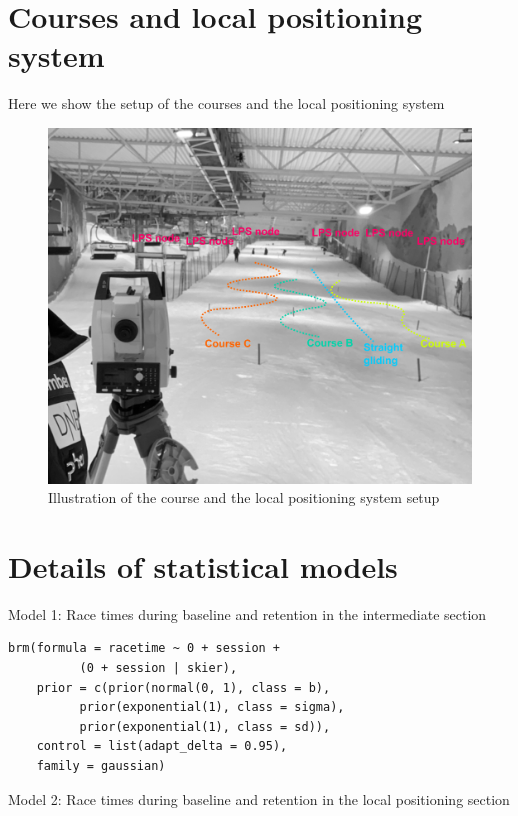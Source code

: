 \documentclass{article}
\begin{document}
\section{Courses and local positioning system} \label{appendixb}
Here we show the setup of the courses and the local positioning system


\begin{figure}[H]
\centering
\includegraphics{figurer/figure_appendix_LPS.jpg}
\caption{Illustration of the course and the local positioning system setup}\label{fig: coursesetting}
\end{figure}




\section{Details of statistical models}\label{appendixc}

Model 1: Race times during baseline and retention in the intermediate section

\begin{verbatim}
brm(formula = racetime ~ 0 + session + 
          (0 + session | skier),
    prior = c(prior(normal(0, 1), class = b),
          prior(exponential(1), class = sigma),
          prior(exponential(1), class = sd)),
    control = list(adapt_delta = 0.95),
    family = gaussian)
\end{verbatim}


Model 2: Race times during baseline and retention in the local positioning section
\end{document}
